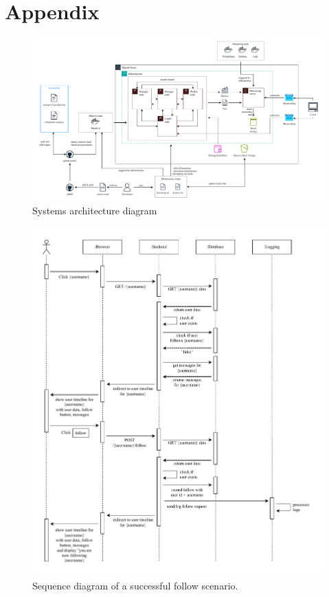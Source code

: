 \section{Appendix}
\label{apendix:systems-architecture}

\begin{figure}[ht]
    \centering
    \includegraphics[height=0.6\textwidth, angle=90]{figures/devops-architecture-architecture_v2.pdf}
    \caption{Systems architecture diagram}
    \label{fig:systems-architecture}
\end{figure}

\begin{figure}[t]
  \begin{center}
\includegraphics[width=\textwidth]{images/figures/Sequence-client.pdf}
    \caption{Sequence diagram of a successful follow scenario.}
    \label{fig:seqhome}
  \end{center}
\end{figure}


